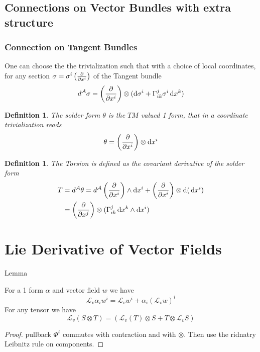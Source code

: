 \documentclass{article}
\numberwithin{theorem}{section}
\newtheorem{definition}[theorem]{Definition}
\renewcommand{\d}[1]{\ensuremath{\operatorname{d}\!{#1}}}
\newcommand{\1}{\mathds{1}}
\begin{document}
\subsection{Connections on Vector Bundles with extra structure}
\subsubsection{Connection on Tangent Bundles}
One can choose the the trivialization such that with a choice of local coordinates,
for any section $\sigma = \sigma^i \left( \pdv{}{x^i} \right)$ of the Tangent bundle 
\[ d^{\mathcal{A}}\sigma = \left( \pdv{}{x^i} \right) \otimes (\d \sigma^i + \Gamma^j_{ik}\sigma^i\d x^k) \]

\begin{definition}
    The solder form $\theta$ is the $TM$ valued 1 form, that in a coordinate trivialization reads 
    \[ \theta = \left( \pdv{}{x^i} \right) \otimes \d x^i\]
\end{definition}

\begin{definition}
    The Torsion is defined as the covariant derivative of the solder form 
\begin{align}
     T &= d^{\mathcal{A}}\theta  = d^{\mathcal{A}}\left( \pdv{}{x^i} \right) \wedge \d x^i + \left(\pdv{}{x^i} \right) \otimes \d( \d x^i) \\
     &= \left( \pdv{}{x^j} \right) \otimes (\Gamma^j_{ik} \d x^k \wedge \d x^i) \\
\end{align}
\end{definition}

\section{Lie Derivative of Vector Fields }



Lemma

For a 1 form $\alpha$ and vector field $w$ we have 
\[ \mathcal{L}_v \alpha_iw^i = \mathcal{L}_v w^i + \alpha_i(\mathcal{L}_vw)^i \]
For any tensor we have 
\[ \mathcal{L}_v(S\otimes T) = (\mathcal{L}_v(T)\otimes S + T\otimes \mathcal{L}_vS )\]
\begin{proof}
    pullback $\Phi^t$ commutes with contraction and with $\otimes$. Then use the ridnatry Leibnitz rule on 
    components. 
\end{proof}
\end{document}
